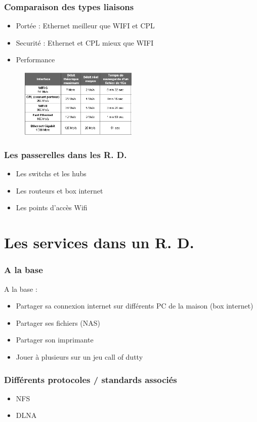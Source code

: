 \documentclass[handout]{beamer}
\begin{document}
\begin{frame}\frametitle{Comparaison des types liaisons} 
\begin{itemize}
\item Portée : Ethernet meilleur que WIFI et CPL
\item Securité : Ethernet et CPL mieux que WIFI
\item Performance
\end{itemize}
\begin{figure}
		\centering
		\includegraphics[width=0.5\textwidth,natwidth=100,natheight=100]{image/performance.png}
\end{figure}
\end{frame}

\begin{frame}\frametitle{Les passerelles dans les R. D.} 
\begin{itemize}
\item Les switchs et les hubs
\item Les routeurs et box internet
\item Les points d'accès Wifi
\end{itemize}
\end{frame}

\section{Les services dans un R. D.}
\begin{frame}\frametitle{A la base } 
A la base :
\begin{itemize}
\item Partager sa connexion internet sur différents PC de la maison (box internet) 
\item Partager ses fichiers (NAS)
\item Partager son imprimante
\item Jouer à plusieurs sur un jeu call of dutty
\end{itemize}
\end{frame}

\begin{frame}\frametitle{Différents protocoles / standards associés} 
\begin{itemize}
\item NFS
\item DLNA
\end{itemize}
\end{frame}
\end{document}
